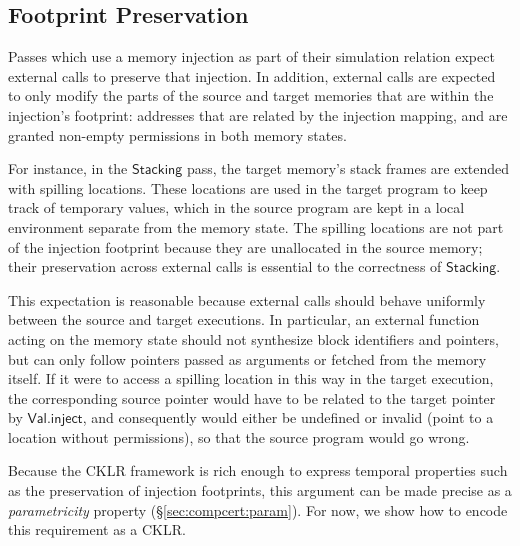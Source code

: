 \documentclass[sigplan,10pt,review,anonymous]{acmart}
\newcommand{\kw}[1]{\ensuremath{ \mathsf{#1} }}
\begin{document}

\subsection{Footprint Preservation} %

Passes which use a memory injection as part of their simulation relation
expect external calls to preserve that injection.
In addition,
external calls are expected to only modify
the parts of the source and target memories
that are within the injection's footprint:
addresses that are
related by the injection mapping,
and are granted non-empty permissions
in both memory states.

For instance,
in the \kw{Stacking} pass,
the target memory's stack frames
are extended with spilling locations.
These locations are used in the target program
to keep track of temporary values,
which in the source program are kept
in a local environment separate from the memory state.
The spilling locations are not part of
the injection footprint
because they are unallocated in the source memory;
their preservation across external calls
is essential to the correctness of \kw{Stacking}.

This expectation is reasonable because
external calls
should behave uniformly between the source and target executions.
In particular,
an external function acting on the memory state
should not synthesize block identifiers and pointers,
but can only follow pointers passed as arguments
or fetched from the memory itself.
If it were to access a spilling location in this way in the target execution,
the corresponding source pointer would have to be
related to the target pointer by \kw{Val.inject},
and consequently would either be undefined
or invalid (point to a location without permissions),
so that the source program would go wrong.

Because the CKLR framework is rich enough to express
temporal properties such as the preservation of injection footprints,
this argument can be made precise as a \emph{parametricity} property
(\S\ref{sec:compcert:param}).
For now,
we show how to encode this requirement as a CKLR.
\end{document}
